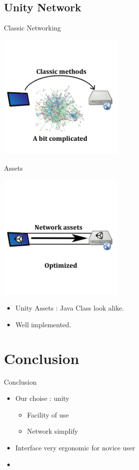 \documentclass[a4paper,10pt]{beamer}
\begin{document}
		\subsection{Unity Network}
			
			\begin{frame}{Classic Networking}
					\centerline{\includegraphics[height=175pt]{images/network/classicnet.png}}
			\end{frame}
			
			\begin{frame}{Assets}
				\centerline{\includegraphics[height=175pt]{images/network/optimized.png}}
				
				\begin{itemize}
						\item Unity Assets : Java Class look alike.
						\item Well implemented.
					\end{itemize}
				
			\end{frame}
			
		

	
	\section{Conclusion}
	
		\begin{frame}{Conclusion}
			\begin{itemize}
				\item Our choise : unity
					\begin{itemize}
						\item Facility of use
						\item Network simplify
					\end{itemize}
				\item Interface very ergonomic for novice user
				\item 
			\end{itemize}
		\end{frame}
\end{document}
